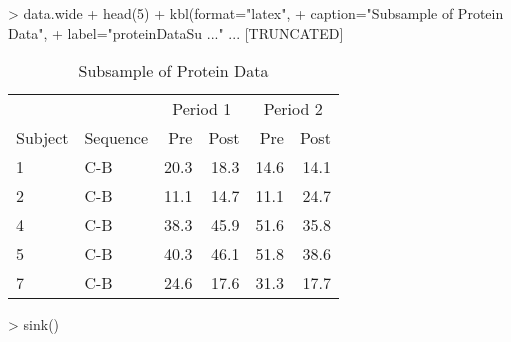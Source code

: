 
> data.wide %
+   head(5) %
+   kbl(format="latex",
+       caption="Subsample of Protein Data",
+       label="proteinDataSu ..." ... [TRUNCATED] 
\begin{table}

\caption{\label{tab:proteinDataSubsample}Subsample of Protein Data}
\centering
\begin{tabular}[t]{l>{}l|rrrr}
\toprule
\multicolumn{2}{c}{ } & \multicolumn{2}{c}{Period 1} & \multicolumn{2}{c}{Period 2} \\
\cmidrule(l{3pt}r{3pt}){3-4} \cmidrule(l{3pt}r{3pt}){5-6}
Subject & Sequence & Pre & Post & Pre & Post\\
\midrule
1 & C-B & 20.3 & 18.3 & 14.6 & 14.1\\
2 & C-B & 11.1 & 14.7 & 11.1 & 24.7\\
4 & C-B & 38.3 & 45.9 & 51.6 & 35.8\\
5 & C-B & 40.3 & 46.1 & 51.8 & 38.6\\
7 & C-B & 24.6 & 17.6 & 31.3 & 17.7\\
\bottomrule
\end{tabular}
\end{table}

> sink()
